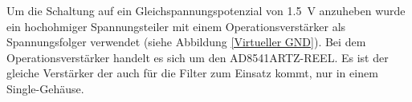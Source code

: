 Um die Schaltung auf ein Gleichspannungspotenzial von \SI{1,5}{\volt} anzuheben wurde ein hochohmiger Spannungsteiler mit einem Operationsverstärker als Spannungsfolger verwendet (siehe Abbildung \ref{Virtueller GND}). Bei dem Operationsverstärker handelt es sich um den AD8541ARTZ-REEL. Es ist der gleiche Verstärker der auch für die Filter zum Einsatz kommt, nur in einem Single-Gehäuse.




